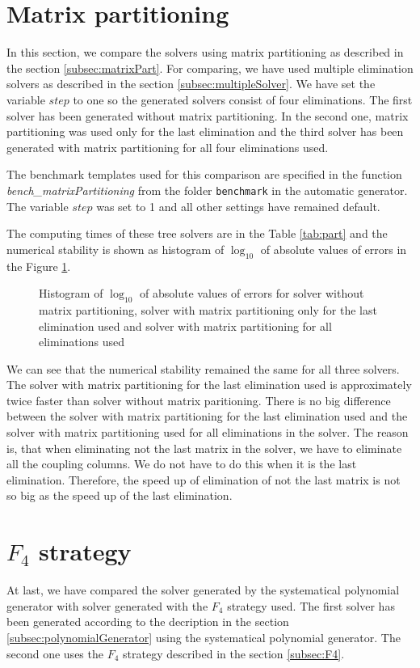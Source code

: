 \section{Matrix partitioning}
\label{exp:part}
In this section, we compare the solvers using matrix partitioning as described in the section \ref{subsec:matrixPart}. For comparing, we have used multiple elimination solvers as described in the section \ref{subsec:multipleSolver}. We have set the variable $step$ to one so the generated solvers consist of four eliminations. The first solver has been generated without matrix partitioning. In the second one, matrix partitioning was used only for the last elimination and the third solver has been generated with matrix partitioning for all four eliminations used.

The benchmark templates used for this comparison are specified in the function \textit{bench\_\-mat\-rix\-Partitioning} from the folder \texttt{benchmark} in the automatic generator. The variable $step$ was set to 1 and all other settings have remained default.

The computing times of these tree solvers are in the Table \ref{tab:part} and the numerical stability is shown as histogram of $\log_{10}$ of absolute values of errors in the Figure \ref{graph:part}.

\begin{figure}[ht]
  \centering
  \resizebox{0.95\textwidth}{!}{}
  \caption{Histogram of $\log_{10}$ of absolute values of errors for solver without matrix partitioning, solver with matrix partitioning only for the last elimination used and solver with matrix partitioning for all eliminations used}
  \label{graph:part}
\end{figure}

We can see that the numerical stability remained the same for all three solvers. The solver with matrix partitioning for the last elimination used is approximately twice faster than solver without matrix paritioning. There is no big difference between the solver with matrix partitioning for the last elimination used and the solver with matrix partitioning used for all eliminations in the solver. The reason is, that when eliminating not the last matrix in the solver, we have to eliminate all the coupling columns. We do not have to do this when it is the last elimination. Therefore, the speed up of elimination of not the last matrix is not so big as the speed up of the last elimination.

\section{$F_4$ strategy}
\label{exp:gen}
At last, we have compared the solver generated by the systematical polynomial generator with solver generated with the $F_4$ strategy used. The first solver has been generated according to the decription in the section \ref{subsec:polynomialGenerator} using the systematical polynomial generator. The second one uses the $F_4$ strategy described in the section \ref{subsec:F4}.

